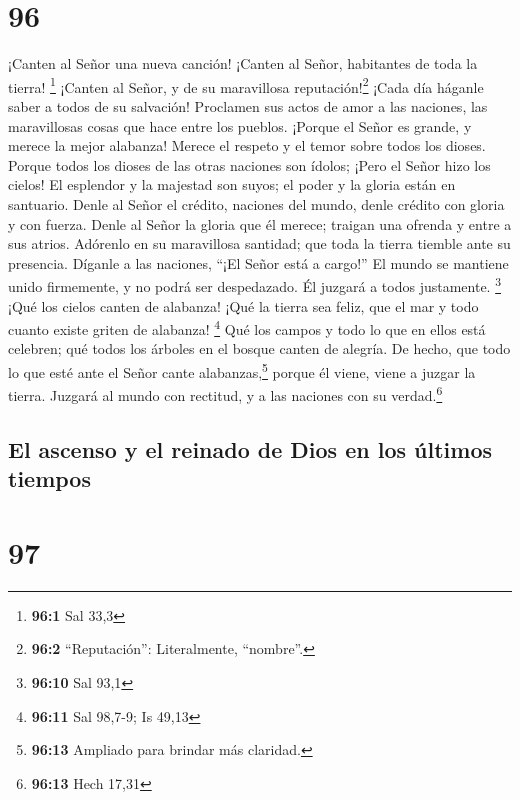 \hypertarget{section-95}{%
\section{96}\label{section-95}}

 ¡Canten al Señor una nueva canción! ¡Canten al Señor,
habitantes de toda la tierra! \footnote{\textbf{96:1} Sal 33,3}
 ¡Canten al Señor, y de su maravillosa
reputación!\footnote{\textbf{96:2} ``Reputación'': Literalmente,
  ``nombre''.} ¡Cada día háganle saber a todos de su salvación!
 Proclamen sus actos de amor a las naciones, las
maravillosas cosas que hace entre los pueblos.  ¡Porque el
Señor es grande, y merece la mejor alabanza! Merece el respeto y el
temor sobre todos los dioses.  Porque todos los dioses de
las otras naciones son ídolos; ¡Pero el Señor hizo los cielos!
 El esplendor y la majestad son suyos; el poder y la
gloria están en santuario.  Denle al Señor el crédito,
naciones del mundo, denle crédito con gloria y con fuerza.
 Denle al Señor la gloria que él merece; traigan una
ofrenda y entre a sus atrios.  Adórenlo en su maravillosa
santidad; que toda la tierra tiemble ante su presencia. 
Díganle a las naciones, ``¡El Señor está a cargo!'' El mundo se mantiene
unido firmemente, y no podrá ser despedazado. Él juzgará a todos
justamente. \footnote{\textbf{96:10} Sal 93,1}  ¡Qué los
cielos canten de alabanza! ¡Qué la tierra sea feliz, que el mar y todo
cuanto existe griten de alabanza! \footnote{\textbf{96:11} Sal 98,7-9;
  Is 49,13}  Qué los campos y todo lo que en ellos está
celebren; qué todos los árboles en el bosque canten de alegría.
 De hecho, que todo lo que esté ante el Señor cante
alabanzas,\footnote{\textbf{96:13} Ampliado para brindar más claridad.}
porque él viene, viene a juzgar la tierra. Juzgará al mundo con
rectitud, y a las naciones con su verdad.\footnote{\textbf{96:13} Hech
  17,31}

\hypertarget{el-ascenso-y-el-reinado-de-dios-en-los-uxfaltimos-tiempos}{%
\subsection{El ascenso y el reinado de Dios en los últimos
tiempos}\label{el-ascenso-y-el-reinado-de-dios-en-los-uxfaltimos-tiempos}}

\hypertarget{section-96}{%
\section{97}\label{section-96}}

